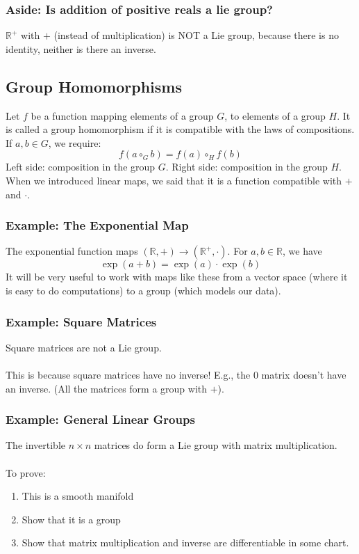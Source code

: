 \documentclass[10pt]{article}
\newcommand{\R}{\mathbb{R}}
\begin{document}
\subsubsection*{Aside: Is addition of positive reals a lie group?}
$\R^+$ with $+$ (instead of multiplication) is NOT a Lie group, because there is no identity, neither is there an inverse.

\subsection*{Group Homomorphisms}
Let $f$ be a function mapping elements of a group $G$, to elements of a group $H$.  It is called a group homomorphism if it is compatible with the laws of compositions.  If $a, b \in G$, we require:
\[f(a \circ_G b) = f(a) \circ_H f(b)\]
Left side: composition in the group $G$.  Right side: composition in the group $H$.
When we introduced linear maps, we said that it is a function compatible with $+$ and $\cdot$.

\subsubsection*{Example: The Exponential Map}
The exponential function maps $(\R, +) \rightarrow (\R^{+}, \cdot)$.  For $a, b \in \R$, we have
\[\exp(a + b) = \exp(a) \cdot \exp(b)\]
It will be very useful to work with maps like these from a vector space (where it is easy to do computations) to a group (which models our data).

\subsubsection*{Example: Square Matrices}
Square matrices are not a Lie group.\\\\
This is because square matrices have no inverse!  E.g., the 0 matrix doesn't have an inverse.  (All the matrices form a group with $+$).

\subsubsection*{Example: General Linear Groups}
The invertible $n \times n$ matrices do form a Lie group with matrix multiplication.\\\\
To prove:
\begin{enumerate}
    \item This is a smooth manifold
    \item Show that it is a group
    \item Show that matrix multiplication and inverse are differentiable in some chart.
\end{enumerate}
\end{document}
